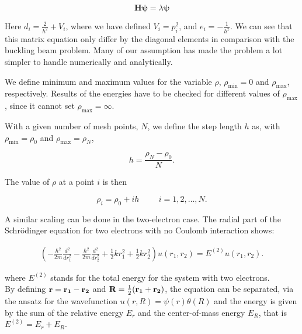 \documentclass[twoside,onecolumn]{article}
\begin{document}
\bigskip

\begin{equation}
\bm{H} \bm{\psi} = \lambda \bm{\psi}
\end{equation}

\bigskip

Here $d_i = \frac{2}{h^2}+V_i $, where we have defined $V_i = p_i^2$, and $e_i =-\frac{1}{h^2}$. We can see that this matrix equation only differ by the diagonal elements in comparison with the buckling beam problem. Many of our assumption has made the problem a lot simpler to handle numerically and analytically. 

\bigskip

We define minimum and maximum values for the variable $\rho$,
$\rho_{\mathrm{min}}=0$  and $\rho_{\mathrm{max}}$, respectively.
Results of the energies have to be checked for different values of 
$\rho_{\mathrm{max}}$, since it cannot set
$\rho_{\mathrm{max}}=\infty$. 

\bigskip

With a given number of mesh points, $N$, we 
define the step length $h$ as, with $\rho_{\mathrm{min}}=\rho_0$  and $\rho_{\mathrm{max}}=\rho_N$,

\bigskip

\begin{equation*}
  h=\frac{\rho_N-\rho_0 }{N}.
\end{equation*}


The value of $\rho$ at a point $i$ is then 


\[
    \rho_i= \rho_0 + ih \hspace{1cm} i=1,2,\dots , N.
\]

\bigskip

A similar scaling can be done in the two-electron case. The radial part of the Schrödinger equation for two electrons with no Coulomb interaction shows:

\begin{align*}
\left(  -\frac{\hbar^2}{2 m} \frac{d^2}{dr_1^2} -\frac{\hbar^2}{2 m} \frac{d^2}{dr_2^2}+ \frac{1}{2}k r_1^2+ \frac{1}{2}k r_2^2\right)u(r_1,r_2)  = E^{(2)} u(r_1,r_2) .
\end{align*}

where $E^{(2)}$ stands for the total energy for the system with  two electrons.\\

By defining $\bf r = r_1 - r_2$ and $\textbf{R} = \frac{1}{2} \bf(r_1 + r_2)$, the equation can be separated, via the ansatz for the wavefunction $u(r,R) = \psi(r)\theta(R)$ and the energy is given by the sum of the relative energy $E_r$ and the center-of-mass energy $E_R$, that is $E^{(2)} = E_r + E_R$.
\end{document}
